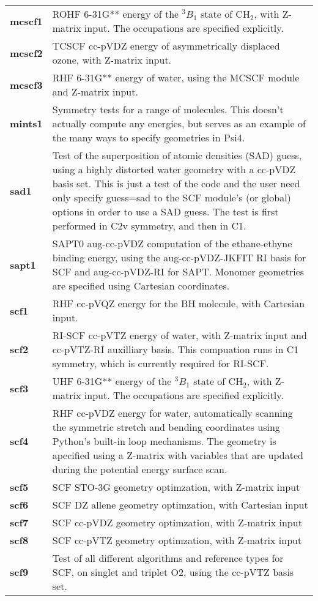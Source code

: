 \begin{tabular*}{\textwidth}[tb]{p{}p{}}
{\bf mcscf1} &  ROHF 6-31G** energy of the $^3B_1$ state of CH$_2$, with Z-matrix input. The occupations are specified explicitly.\\
{\bf mcscf2} &  TCSCF cc-pVDZ  energy of asymmetrically displaced ozone, with Z-matrix input.\\
{\bf mcscf3} &  RHF 6-31G** energy of water, using the MCSCF module and Z-matrix input.\\
{\bf mints1} &  Symmetry tests for a range of molecules.  This doesn't actually compute any energies, but serves as an example of the many ways to specify geometries in Psi4.\\
{\bf sad1} &  Test of the superposition of atomic densities (SAD) guess, using a highly distorted water geometry with a cc-pVDZ basis set.  This is just a test of the code and the user need only specify guess=sad to the SCF module's (or global) options in order to use a SAD guess. The test is first performed in C2v symmetry, and then in C1.\\
{\bf sapt1} &  SAPT0 aug-cc-pVDZ computation of the ethane-ethyne binding energy, using the aug-cc-pVDZ-JKFIT RI basis for SCF and aug-cc-pVDZ-RI for SAPT.  Monomer geometries are specified using Cartesian coordinates.\\
{\bf scf1} &  RHF cc-pVQZ energy for the BH molecule, with Cartesian input.\\
{\bf scf2} &  RI-SCF cc-pVTZ energy of water, with Z-matrix input and cc-pVTZ-RI auxilliary basis. This compuation runs in C1 symmetry, which is currently required for RI-SCF.\\
{\bf scf3} &  UHF 6-31G** energy of the $^3B_1$ state of CH$_2$, with Z-matrix input. The occupations are specified explicitly.\\
{\bf scf4} &  RHF cc-pVDZ energy for water, automatically scanning the symmetric stretch and bending coordinates using Python's built-in loop mechanisms.  The geometry is apecified using a Z-matrix with variables that are updated during the potential energy surface scan.\\
{\bf scf5} &  SCF STO-3G geometry optimzation, with Z-matrix input\\
{\bf scf6} &  SCF DZ allene geometry optimzation, with Cartesian input\\
{\bf scf7} &  SCF cc-pVDZ geometry optimzation, with Z-matrix input\\
{\bf scf8} &  SCF cc-pVTZ geometry optimzation, with Z-matrix input\\
{\bf scf9} &  Test of all different algorithms and reference types for SCF, on singlet and triplet O2, using the cc-pVTZ basis set.\\
\end{tabular*}
